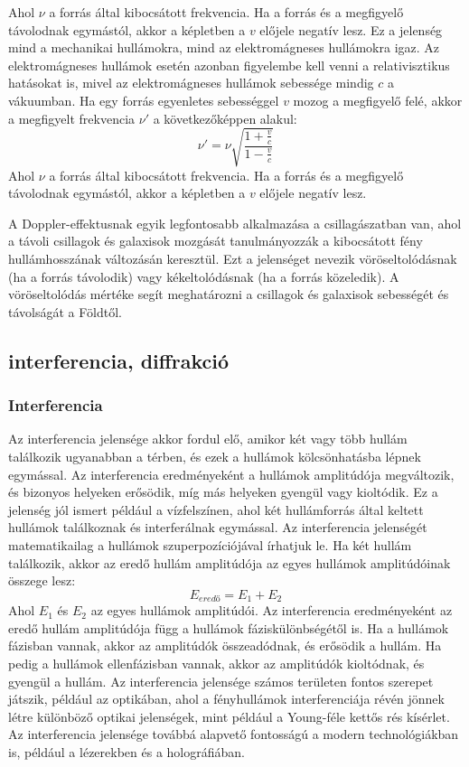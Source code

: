 \documentclass[../main.tex]{subfiles}
\begin{document}
Ahol $\nu$ a forrás által kibocsátott frekvencia. Ha a forrás és a megfigyelő távolodnak egymástól, akkor a képletben a $v$ előjele negatív lesz.
Ez a jelenség mind a mechanikai hullámokra, mind az elektromágneses hullámokra igaz. Az elektromágneses hullámok esetén azonban figyelembe kell venni a relativisztikus hatásokat is, mivel az elektromágneses hullámok sebessége mindig $c$ a vákuumban. Ha egy forrás egyenletes sebességgel $v$ mozog a megfigyelő felé, akkor a megfigyelt frekvencia $\nu'$ a következőképpen alakul:
\begin{equation}
    \nu' = \nu \sqrt{\frac{1 + \frac{v}{c}}{1 - \frac{v}{c}}}
\end{equation}
Ahol $\nu$ a forrás által kibocsátott frekvencia. Ha a forrás és a megfigyelő távolodnak egymástól, akkor a képletben a $v$ előjele negatív lesz.

A Doppler-effektusnak egyik legfontosabb alkalmazása a csillagászatban van, ahol a távoli csillagok és galaxisok mozgását tanulmányozzák a kibocsátott fény hullámhosszának változásán keresztül.
Ezt a jelenséget nevezik vöröseltolódásnak (ha a forrás távolodik) vagy kékeltolódásnak (ha a forrás közeledik). A vöröseltolódás mértéke segít meghatározni a csillagok és galaxisok sebességét és távolságát a Földtől.

\subsection{interferencia, diffrakció}
\subsubsection{Interferencia}
Az interferencia jelensége akkor fordul elő, amikor két vagy több hullám találkozik ugyanabban a térben, és ezek a hullámok kölcsönhatásba lépnek egymással.
Az interferencia eredményeként a hullámok amplitúdója megváltozik, és bizonyos helyeken erősödik, míg más helyeken gyengül vagy kioltódik. Ez a jelenség jól ismert például a vízfelszínen, ahol két hullámforrás által keltett hullámok találkoznak és interferálnak egymással.
Az interferencia jelenségét matematikailag a hullámok szuperpozíciójával írhatjuk le. Ha két hullám találkozik, akkor az eredő hullám amplitúdója az egyes hullámok amplitúdóinak összege lesz:
\begin{equation}
    E_{eredő} = E_1 + E_2
\end{equation}
Ahol $E_1$ és $E_2$ az egyes hullámok amplitúdói. Az interferencia eredményeként az eredő hullám amplitúdója függ a hullámok fáziskülönbségétől is. Ha a hullámok fázisban vannak, akkor az amplitúdók összeadódnak, és erősödik a hullám. Ha pedig a hullámok ellenfázisban vannak, akkor az amplitúdók kioltódnak, és gyengül a hullám.
Az interferencia jelensége számos területen fontos szerepet játszik, például az optikában, ahol a fényhullámok interferenciája révén jönnek létre különböző optikai jelenségek, mint például a Young-féle kettős rés kísérlet.
Az interferencia jelensége továbbá alapvető fontosságú a modern technológiákban is, például a lézerekben és a holográfiában.
\end{document}
